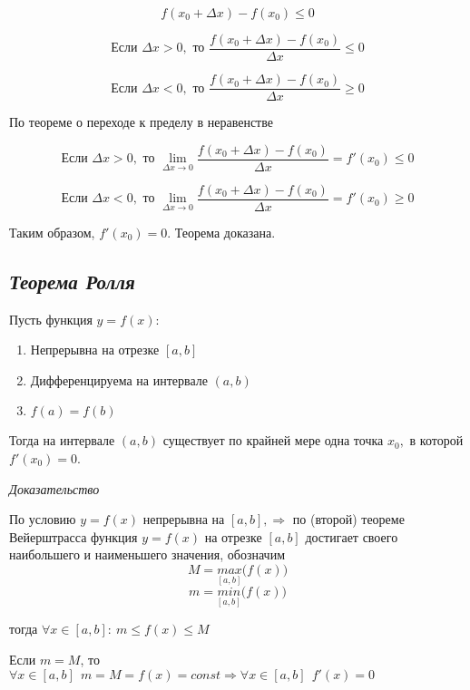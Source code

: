 $$
f(x_0 + \Delta x) - f(x_0) \leqslant 0
$$

$$
\text{Если } \Delta x > 0, \text{ то } {\frac{f(x_0+\Delta x) - f(x_0)}{\Delta x}} \leqslant 0
$$

$$
\text{Если } \Delta x < 0, \text{ то }{\frac{f(x_0+\Delta x) - f(x_0)}{\Delta x}} \geqslant 0
$$

По теореме о переходе к пределу в неравенстве

$$
\text{Если } \Delta x > 0, \text{ то } \lim\limits_{\Delta x \rightarrow 0}{\frac{f(x_0 + \Delta x) - f(x_0)}{\Delta x}} = f'(x_0) \leqslant 0
$$

$$
\text{Если } \Delta x < 0, \text{ то }\lim\limits_{\Delta x \rightarrow 0}{\frac{f(x_0 + \Delta x) - f(x_0)}{\Delta x}} = f'(x_0) \geqslant 0
$$

Таким образом, $f'(x_0) = 0$. Теорема доказана.
\newpage 
\subsection{\textit{Теорема Ролля}}

Пусть функция $y = f(x):$
\begin{enumerate}

\item Непрерывна на отрезке $[a, b]$
\item Дифференцируема на интервале $(a, b)$
\item $f(a) = f(b)$

\end{enumerate}

Тогда на интервале $(a, b)$ существует по крайней мере одна точка $x_0,$ в которой $f'(x_0) = 0$.

\textit{Доказательство}

По условию $y = f(x)$ непрерывна на $[a, b], \Rightarrow $ по (второй) теореме Вейерштрасса функция $y = f(x)$ на отрезке $[a,b]$ достигает своего наибольшего и наименьшего значения, обозначим $$M = \underset{[a, b]}{max}\big(f(x)\big)$$ $$m = \underset{[a, b]}{min}\big(f(x)\big)$$

тогда $\forall x \in [a, b] : \ m \leqslant f(x) \leqslant M$

Если $m = M$, то $\forall x \in [a, b] \ \ m = M = f(x) = const \Rightarrow \forall x \in [a, b] \ \ f'(x) = 0$

